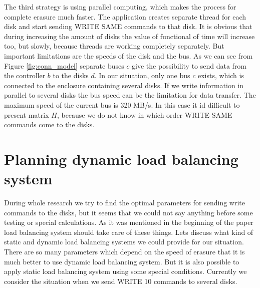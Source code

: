 The third strategy is using parallel computing, which makes the process for complete erasure much faster. The application creates separate thread for each disk and start sending WRITE SAME commands to that disk. It is obvious that during increasing the amount of disks the value of functional of time will increase too, but slowly, because threads are working completely separately. But important limitations are the speeds of the disk and the bus. As we can see from Figure \ref{fig:conn_model} separate buses $c$ give the possibility to send data from the controller $b$ to the disks $d$. In our situation, only one bus $c$ exists, which is connected to the enclosure containing several disks. If we write information in parallel to several disks the bus speed can be the limitation for data transfer. The maximum speed of the current bus is 320 MB/s. In this case it id difficult to present matrix $H$, because we do not know in which order WRITE SAME commands come to the disks.


\section{Planning dynamic load balancing system}

During whole research we try to find the optimal parameters for sending write commands to the disks, but it seems that we could not say anything before some testing or special calculations. As it was mentioned in the beginning of the paper load balancing system should take care of these things. Lets discuss what kind of static and dynamic load balancing systems we could provide for our situation. There are so many parameters which depend on the speed of erasure that it is much better to use dynamic load balancing system. But it is also possible to apply static load balancing system using some special conditions. Currently we consider the situation when we send WRITE 10 commands to several disks. 

